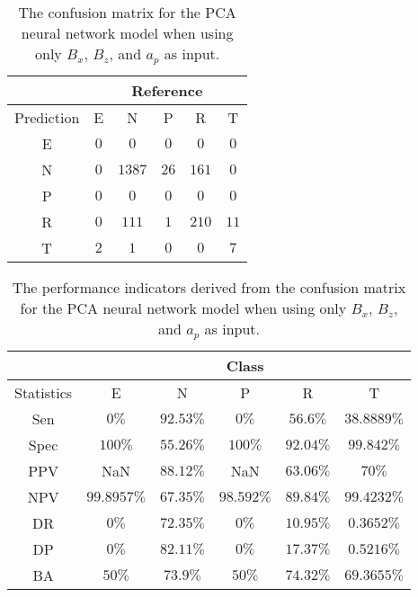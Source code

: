 \begin{table}[!ht]
	\centering
	\begin{tabular}{|c|c|c|c|c|c|}
		\hline
		 & \multicolumn{5}{|c|}{Reference} \\ \hline
		 Prediction & E & N & P & R & T \\ \hline
		 E & $0$ & $0$ & $0$ & $0$ & $0$ \\ \hline
		 N & $0$ & $1387$ & $26$ & $161$ & $0$ \\ \hline
		 P & $0$ & $0$ & $0$ & $0$ & $0$ \\ \hline
		 R & $0$ & $111$ & $1$ & $210$ & $11$ \\ \hline
		 T & $2$ & $1$ & $0$ & $0$ & $7$ \\ \hline
	\end{tabular}
	\caption{The confusion matrix for the PCA neural network model when using only $B_{x}$, $B_{z}$, and $a_{p}$ as input.}
	\label{tab:cm:xzap:pcaNNet}
\end{table}

\begin{table}[!ht]
	\centering
	\begin{tabular}{|c|c|c|c|c|c|}
		\hline
		 & \multicolumn{5}{c|}{Class} \\ \hline
		Statistics & E & N & P & R & T \\ \hline
		Sen & $0\%$ & $92.53\%$ & $0\%$ & $56.6\%$ & $38.8889\%$ \\ \hline
		Spec & $100\%$ & $55.26\%$ & $100\%$ & $92.04\%$ & $99.842\%$ \\ \hline
		PPV & NaN & $88.12\%$ & NaN & $63.06\%$ & $70\%$ \\ \hline
		NPV & $99.8957\%$ & $67.35\%$ & $98.592\%$ & $89.84\%$ & $99.4232\%$ \\ \hline
		DR & $0\%$ & $72.35\%$ & $0\%$ & $10.95\%$ & $0.3652\%$ \\ \hline
		DP & $0\%$ & $82.11\%$ & $0\%$ & $17.37\%$ & $0.5216\%$ \\ \hline
		BA & $50\%$ & $73.9\%$ & $50\%$ & $74.32\%$ & $69.3655\%$ \\ \hline
	\end{tabular}
	\caption{The performance indicators derived from the confusion matrix for the PCA neural network model when using only $B_{x}$, $B_{z}$, and $a_{p}$ as input.}
	\label{tab:cs:reverse:xzap:pcaNNet}
\end{table}

